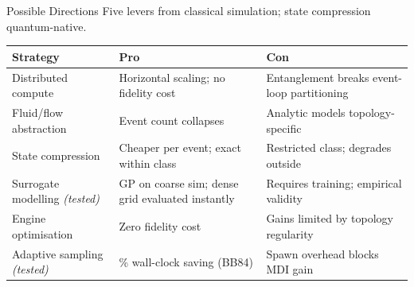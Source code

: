 \documentclass[10pt]{beamer}
\newcommand{\lighthline}{\arrayrulecolor{gray!35}\hline\arrayrulecolor{black}}
\begin{document}
\begin{frame}{Possible Directions}
    \vspace{0.15cm}
    \small Five levers from classical simulation; state compression quantum-native.

    \vspace{0.2cm}
    {\fontsize{6}{8}\selectfont
    \setlength{\tabcolsep}{5pt}
    \renewcommand{\arraystretch}{1.55}
    \begin{tabular}{@{}
        >{\raggedright\arraybackslash}p{2.3cm}
        >{\raggedright\arraybackslash}p{3.55cm}
        >{\raggedright\arraybackslash}p{3.55cm}@{}}
        \toprule
        \scriptsize\textbf{Strategy} & \scriptsize\textbf{Pro} & \scriptsize\textbf{Con} \\
        \midrule
        Distributed compute & Horizontal scaling; no fidelity cost & Entanglement breaks event-loop partitioning \\
        \lighthline
        Fluid/flow abstraction & Event count collapses & Analytic models topology-specific \\
        \lighthline
        State compression & Cheaper per event; exact within class & Restricted class; degrades outside \\
        \lighthline
        Surrogate modelling \textit{(tested)} & GP on coarse sim; dense grid evaluated instantly & Requires training; empirical validity \\
        \lighthline
        Engine optimisation & Zero fidelity cost & Gains limited by topology regularity \\
        \lighthline
        Adaptive sampling \textit{(tested)} & 30\% wall-clock saving (BB84) & Spawn overhead blocks MDI gain \\
        \bottomrule
    \end{tabular}
    }
\end{frame}
\end{document}
